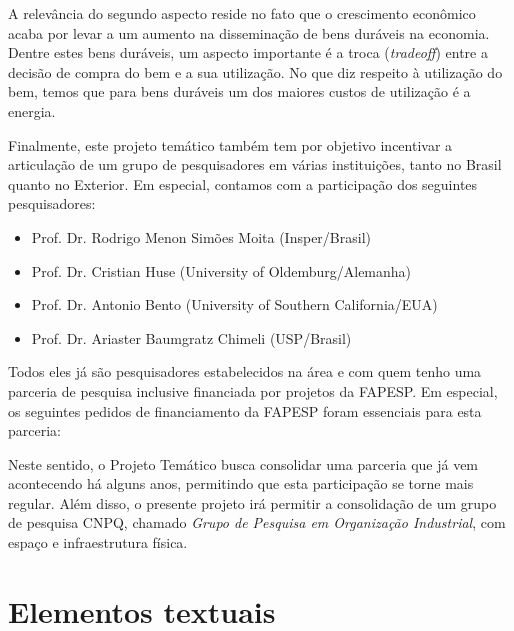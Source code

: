 \documentclass[
	12pt,				%
	openright,			%
	twoside,			%
	a4paper,			%
	english,			%
	french,				%
	spanish,			%
	brazil,				%
	]{abntex2}
\begin{document}
A relevância do segundo aspecto reside no fato que o crescimento econômico acaba por levar a um aumento na disseminação de bens duráveis na economia. Dentre estes bens duráveis, um aspecto importante é a troca (\textit{tradeoff}) entre a decisão de compra do bem e a sua utilização. No que diz respeito à utilização do bem, temos que para bens duráveis um dos maiores custos de utilização é a energia. 

Finalmente, este projeto temático também tem por objetivo incentivar a articulação de um grupo de pesquisadores em várias instituições, tanto no Brasil quanto no Exterior. Em especial, contamos com a participação dos seguintes pesquisadores:

\begin{itemize}
 	\item Prof. Dr. Rodrigo Menon Simões Moita (Insper/Brasil)
 	\item Prof. Dr. Cristian Huse (University of Oldemburg/Alemanha)
 	\item Prof. Dr. Antonio Bento (University of Southern California/EUA)
 	\item Prof. Dr. Ariaster Baumgratz Chimeli (USP/Brasil)
 \end{itemize} 

Todos eles já são pesquisadores estabelecidos na área e com quem tenho uma parceria de pesquisa inclusive financiada por projetos da FAPESP. Em especial, os seguintes pedidos de financiamento da FAPESP foram essenciais para esta parceria:


Neste sentido, o Projeto Temático busca consolidar uma parceria que já vem acontecendo há alguns anos, permitindo que esta participação se torne mais regular. Além disso, o presente projeto  irá permitir a consolidação de um grupo de pesquisa CNPQ, chamado \textit{Grupo de Pesquisa em Organização Industrial}, com espaço e infraestrutura física.

\chapter{Elementos textuais}

\lipsum[1-10]

\end{document}
